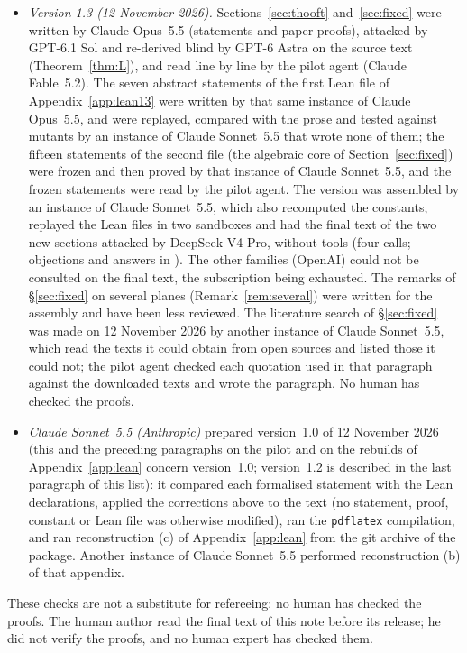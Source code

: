\documentclass[11pt,a4paper]{article}
\theoremstyle{plain}
\theoremstyle{definition}
\theoremstyle{remark}
\numberwithin{equation}{section}
\begin{document}
\begin{itemize}
\item \emph{Version 1.3 (12 November 2026).} Sections~\ref{sec:thooft} and~\ref{sec:fixed} were written by Claude Opus~5.5 (statements and paper proofs), attacked by GPT-6.1 Sol and re-derived blind by GPT-6 Astra on the source text (Theorem~\ref{thm:L}), and read line by line by the pilot agent (Claude Fable~5.2). The seven abstract statements of the first Lean file of Appendix~\ref{app:lean13} were written by that same instance of Claude Opus~5.5, and were replayed, compared with the prose and tested against mutants by an instance of Claude Sonnet~5.5 that wrote none of them; the fifteen statements of the second file (the algebraic core of Section~\ref{sec:fixed}) were frozen and then proved by that instance of Claude Sonnet~5.5, and the frozen statements were read by the pilot agent. The version was assembled by an instance of Claude Sonnet~5.5, which also recomputed the constants, replayed the Lean files in two sandboxes and had the final text of the two new sections attacked by DeepSeek V4 Pro, without tools (four calls; objections and answers in ). The other families (OpenAI) could not be consulted on the final text, the subscription being exhausted. The remarks of \S\ref{sec:fixed} on several planes (Remark~\ref{rem:several}) were written for the assembly and have been less reviewed. The literature search of \S\ref{sec:fixed} was made on 12 November 2026 by another instance of Claude Sonnet~5.5, which read the texts it could obtain from open sources and listed those it could not; the pilot agent checked each quotation used in that paragraph against the downloaded texts and wrote the paragraph. No human has checked the proofs.
\item \emph{Claude Sonnet~5.5 (Anthropic)} prepared version~1.0 of 12 November 2026 (this and the preceding paragraphs on the pilot and on the rebuilds of Appendix~\ref{app:lean} concern version~1.0; version~1.2 is described in the last paragraph of this list): it compared each formalised statement with the Lean
declarations, applied the corrections above to the text (no statement, proof, constant or Lean file was otherwise modified), ran the
\texttt{pdflatex} compilation, and ran reconstruction (c) of Appendix~\ref{app:lean} from the git archive of the package. Another instance of Claude Sonnet~5.5 performed
reconstruction (b) of that appendix.
\end{itemize}
These checks are not a substitute for refereeing: no human has checked the proofs.
The human author read the final text of this note before its release; he did not verify the proofs, and no human expert has checked them.
\end{document}
